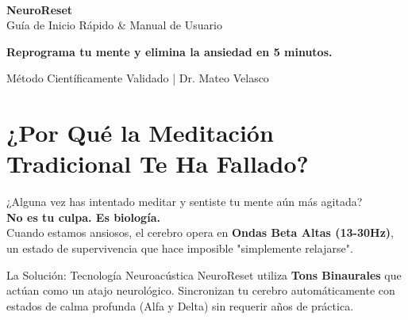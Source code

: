 \documentclass[11pt,oneside]{article}
\begin{document}
\begin{center}
    \vspace*{2cm}
    {\color{neoncyan}\Huge \faBrain} \\
    \vspace{0.5cm}
    {\color{white}\Huge \bfseries NeuroReset} \\
    \vspace{0.3cm}
    {\color{neonpink}\Large Guía de Inicio Rápido \& Manual de Usuario} \\
    \vspace{1cm}
    \begin{tcolorbox}[colback=neoncyan!10, colframe=neoncyan, arc=5mm, center, width=12cm]
        \centering \bfseries \color{white} Reprograma tu mente y elimina la ansiedad en 5 minutos.
    \end{tcolorbox}
    \vspace{1cm}
    {\small \color{neoncyan!50} Método Científicamente Validado | Dr. Mateo Velasco}
\end{center}

\vspace{1.5cm}

\section{¿Por Qué la Meditación Tradicional Te Ha Fallado?}
\begin{neurocard}{}
    ¿Alguna vez has intentado meditar y sentiste tu mente aún más agitada? \\
    \textbf{\color{neonpink}No es tu culpa. Es biología.} \\
    
    Cuando estamos ansiosos, el cerebro opera en \textbf{Ondas Beta Altas (13-30Hz)}, un estado de supervivencia que hace imposible "simplemente relajarse".
\end{neurocard}

\begin{neurocard}[colframe=neoncyan!50!black]{La Solución: Tecnología Neuroacústica}
    NeuroReset utiliza \textbf{Tons Binaurales} que actúan como un atajo neurológico. Sincronizan tu cerebro automáticamente con estados de calma profunda (Alfa y Delta) sin requerir años de práctica.
\end{neurocard}

\newpage

\end{document}
